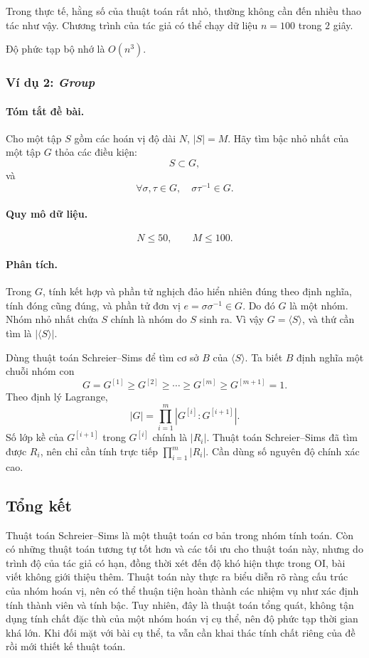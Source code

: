 \documentclass[11pt]{article}
\begin{document}
Trong thực tế, hằng số của thuật toán rất nhỏ, thường không cần đến nhiều thao
tác như vậy. Chương trình của tác giả có thể chạy dữ liệu \(n=100\) trong
\(2\) giây.

Độ phức tạp bộ nhớ là \(O(n^3)\).

\subsubsection{Ví dụ 2: \emph{Group}}

\paragraph{Tóm tắt đề bài.}
Cho một tập \(S\) gồm các hoán vị độ dài \(N\), \(|S|=M\). Hãy tìm bậc nhỏ nhất
của một tập \(G\) thỏa các điều kiện:
\[
  S\subset G,
\]
và
\[
  \forall\sigma,\tau\in G,\quad \sigma\tau^{-1}\in G.
\]

\paragraph{Quy mô dữ liệu.}
\[
  N\le 50,\qquad M\le 100.
\]

\paragraph{Phân tích.}
Trong \(G\), tính kết hợp và phần tử nghịch đảo hiển nhiên đúng theo định
nghĩa, tính đóng cũng đúng, và phần tử đơn vị \(e=\sigma\sigma^{-1}\in G\). Do
đó \(G\) là một nhóm. Nhóm nhỏ nhất chứa \(S\) chính là nhóm do \(S\) sinh ra.
Vì vậy \(G=\langle S\rangle\), và thứ cần tìm là \(|\langle S\rangle|\).

Dùng thuật toán Schreier--Sims để tìm cơ sở \(B\) của \(\langle S\rangle\).
Ta biết \(B\) định nghĩa một chuỗi nhóm con
\[
  G=G^{[1]}\ge G^{[2]}\ge\cdots\ge G^{[m]}\ge G^{[m+1]}=1.
\]
Theo định lý Lagrange,
\[
  |G|=\prod_{i=1}^{m}|G^{[i]}:G^{[i+1]}|.
\]
Số lớp kề của \(G^{[i+1]}\) trong \(G^{[i]}\) chính là \(|R_i|\). Thuật toán
Schreier--Sims đã tìm được \(R_i\), nên chỉ cần tính trực tiếp
\(\prod_{i=1}^{m}|R_i|\). Cần dùng số nguyên độ chính xác cao.

\subsection{Tổng kết}

Thuật toán Schreier--Sims là một thuật toán cơ bản trong nhóm tính toán. Còn có
những thuật toán tương tự tốt hơn và các tối ưu cho thuật toán này, nhưng do
trình độ của tác giả có hạn, đồng thời xét đến độ khó hiện thực trong OI, bài
viết không giới thiệu thêm. Thuật toán này thực ra biểu diễn rõ ràng cấu trúc
của nhóm hoán vị, nên có thể thuận tiện hoàn thành các nhiệm vụ như xác định
tính thành viên và tính bậc. Tuy nhiên, đây là thuật toán tổng quát, không tận
dụng tính chất đặc thù của một nhóm hoán vị cụ thể, nên độ phức tạp thời gian
khá lớn. Khi đối mặt với bài cụ thể, ta vẫn cần khai thác tính chất riêng của
đề rồi mới thiết kế thuật toán.
\end{document}
